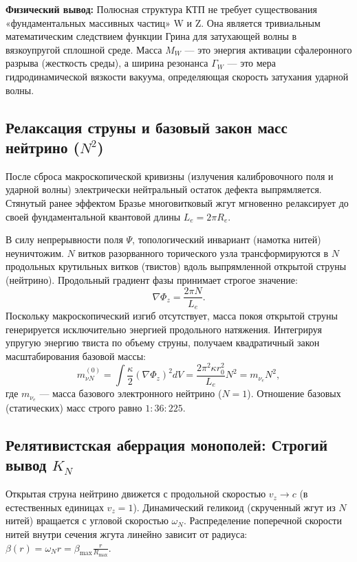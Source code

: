 \documentclass[12pt,a4paper]{article}
\begin{document}
\textbf{Физический вывод:} Полюсная структура КТП не требует существования «фундаментальных массивных частиц» W и Z. Она является тривиальным математическим следствием функции Грина для затухающей волны в вязкоупругой сплошной среде. Масса $M_W$ — это энергия активации сфалеронного разрыва (жесткость среды), а ширина резонанса $\Gamma_W$ — это мера гидродинамической вязкости вакуума, определяющая скорость затухания ударной волны. 
	
\subsection{Релаксация струны и базовый закон масс нейтрино ($N^2$)}
После сброса макроскопической кривизны (излучения калибровочного поля и ударной волны) электрически нейтральный остаток дефекта выпрямляется. Стянутый ранее эффектом Бразье многовитковый жгут мгновенно релаксирует до своей фундаментальной квантовой длины $L_e = 2\pi R_e$.
	
В силу непрерывности поля $\Psi$, топологический инвариант (намотка нитей) неуничтожим. $N$ витков разорванного торического узла трансформируются в $N$ продольных крутильных витков (твистов) вдоль выпрямленной открытой струны (нейтрино). Продольный градиент фазы принимает строгое значение:
\begin{equation}
\nabla \Phi_z = \frac{2\pi N}{L_e}.
\end{equation}
Поскольку макроскопический изгиб отсутствует, масса покоя открытой струны генерируется исключительно энергией продольного натяжения. Интегрируя упругую энергию твиста по объему струны, получаем квадратичный закон масштабирования базовой массы:
\begin{equation}
m_{\nu N}^{(0)} = \int \frac{\kappa}{2} (\nabla \Phi_z)^2 dV = \frac{2\pi^2 \kappa r_0^2}{L_e} N^2 = m_{\nu_e} N^2,
\label{eq:neutrino_n2}
\end{equation}
где $m_{\nu_e}$ — масса базового электронного нейтрино ($N=1$). Отношение базовых (статических) масс строго равно $1 : 36 : 225$.
	
\subsection{Релятивистская аберрация монополей: Строгий вывод $K_N$}
Открытая струна нейтрино движется с продольной скоростью $v_z \to c$ (в естественных единицах $v_z = 1$). Динамический геликоид (скрученный жгут из $N$ нитей) вращается с угловой скоростью $\omega_N$. Распределение поперечной скорости нитей внутри сечения жгута линейно зависит от радиуса: $\beta(r) = \omega_N r = \beta_{\text{max}} \frac{r}{R_{\text{max}}}$.
\end{document}
